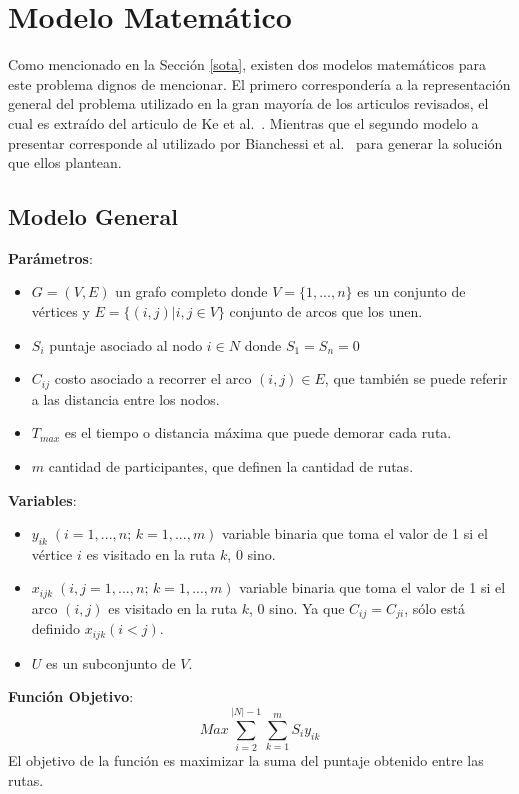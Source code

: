 \section{Modelo Matem\'atico}\label{model}
Como mencionado en la Secci\'on \ref{sota}, existen dos modelos matem\'aticos para este problema dignos de mencionar. El primero corresponder\'ia a la representaci\'on general del problema utilizado en la gran mayor\'ia de los articulos revisados, el cual es extra\'ido del articulo de Ke et al.~\cite{KE2008648}. Mientras que el segundo modelo a presentar corresponde al utilizado por Bianchessi et al.~\cite{doi:10.1111/itor.12422} para generar la soluci\'on que ellos plantean.

\subsection{Modelo General}\label{model:general}
\noindent
\textbf{Par\'ametros}:\\
\begin{itemize}
    \item $G = (V,E)$ un grafo completo donde $V = \{1,...,n\}$ es un conjunto de v\'ertices y $E = \{(i,j)|i,j\in V\}$ conjunto de arcos que los unen.\\
    \item $S_{i}$ puntaje asociado al nodo $i \in N$ donde $S_{1} = S_{n} = 0$\\
    \item $C_{ij}$ costo asociado a recorrer el arco $(i,j) \in E$, que tambi\'en se puede referir a las distancia entre los nodos.\\
    \item $T_{max}$ es el tiempo o distancia m\'axima que puede demorar cada ruta.\\
    \item $m$ cantidad de participantes, que definen la cantidad de rutas.\\
\end{itemize}
\textbf{Variables}:\\
\begin{itemize}
    \item $y_{ik}\; (i = 1,...,n;\, k = 1,...,m)$ variable binaria que toma el valor de 1 si el v\'ertice $i$ es visitado en la ruta $k$, 0 sino.\\
    \item $x_{ijk}\; (i,j = 1,...,n;\, k = 1,...,m)$ variable binaria que toma el valor de 1 si el arco $(i,j)$ es visitado en la ruta $k$, 0 sino. Ya que $C_{ij} = C_{ji}$, s\'olo est\'a definido $x_{ijk}(i<j)$.\\
    \item $U$ es un subconjunto de $V$.\\
\end{itemize}
\textbf{Funci\'on Objetivo}:
\begin{equation}\label{eq:fx}
    Max \sum_{i=2}^{|N|-1}\sum_{k=1}^{m} S_{i}y_{ik}
\end{equation}
El objetivo de la funci\'on es maximizar la suma del puntaje obtenido entre las rutas.\\

